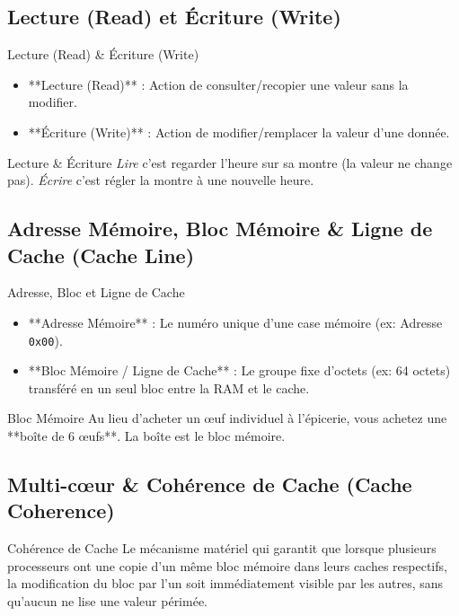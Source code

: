 \documentclass[12pt,a4paper]{article}
\begin{document}
\subsection{Lecture (Read) et Écriture (Write)}
\begin{definitionbox}{Lecture (Read) \& Écriture (Write)}
\begin{itemize}
    \item **Lecture (Read)** : Action de consulter/recopier une valeur sans la modifier.
    \item **Écriture (Write)** : Action de modifier/remplacer la valeur d'une donnée.
\end{itemize}
\end{definitionbox}

\begin{analogybox}{Lecture \& Écriture}
\textit{Lire} c'est regarder l'heure sur sa montre (la valeur ne change pas). \textit{Écrire} c'est régler la montre à une nouvelle heure.
\end{analogybox}

\subsection{Adresse Mémoire, Bloc Mémoire \& Ligne de Cache (Cache Line)}
\begin{definitionbox}{Adresse, Bloc et Ligne de Cache}
\begin{itemize}
    \item **Adresse Mémoire** : Le numéro unique d'une case mémoire (ex: Adresse \texttt{0x00}).
    \item **Bloc Mémoire / Ligne de Cache** : Le groupe fixe d'octets (ex: 64 octets) transféré en un seul bloc entre la RAM et le cache.
\end{itemize}
\end{definitionbox}

\begin{analogybox}{Bloc Mémoire}
Au lieu d'acheter un œuf individuel à l'épicerie, vous achetez une **boîte de 6 œufs**. La boîte est le bloc mémoire.
\end{analogybox}

\subsection{Multi-cœur \& Cohérence de Cache (Cache Coherence)}
\begin{definitionbox}{Cohérence de Cache}
Le mécanisme matériel qui garantit que lorsque plusieurs processeurs ont une copie d'un même bloc mémoire dans leurs caches respectifs, la modification du bloc par l'un soit immédiatement visible par les autres, sans qu'aucun ne lise une valeur périmée.
\end{definitionbox}
\end{document}
